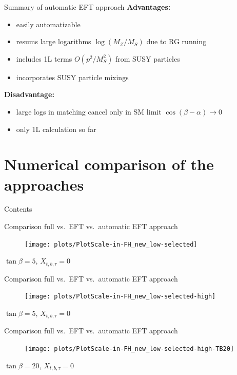 \documentclass[hyperref={pdfpagelabels=false},ngerman]{beamer}
\renewcommand{\emph}{\textbf}
\begin{document}
\begin{frame}{Summary of automatic EFT approach}
  \emph{Advantages:}
  \begin{itemize}
  \item easily automatizable
  \item resums large logarithms $\log(M_Z/M_S)$ due to RG running
  \item includes 1L terms $O(p^2/M_S^2)$ from SUSY particles
  \item incorporates SUSY particle mixings
  \end{itemize}
  \emph{Disadvantage:}
  \begin{itemize}
  \item large logs in matching cancel only in SM limit $\cos(\beta - \alpha) \rightarrow 0$
  \item only 1L calculation so far
  \end{itemize}
\end{frame}


\section{Numerical comparison of the approaches}

\begin{frame}{Contents}
  \tableofcontents[currentsection]  
\end{frame}

\begin{frame}{Comparison full vs.\ EFT vs.\ automatic EFT approach}
  \begin{figure}
    \centering
    \texttt{[image: plots/PlotScale-in-FH\_new\_low-selected]}
  \end{figure}
  $\tan\beta = 5$, $X_{t,b,\tau} = 0$
\end{frame}

\begin{frame}{Comparison full vs.\ EFT vs.\ automatic EFT approach}
  \begin{figure}
    \centering
    \texttt{[image: plots/PlotScale-in-FH\_new\_low-selected-high]}
  \end{figure}
  $\tan\beta = 5$, $X_{t,b,\tau} = 0$
\end{frame}

\begin{frame}[noframenumbering]{Comparison full vs.\ EFT vs.\ automatic EFT approach}
  \begin{figure}
    \centering
    \texttt{[image: plots/PlotScale-in-FH\_new\_low-selected-high-TB20]}
  \end{figure}
  $\tan\beta = 20$, $X_{t,b,\tau} = 0$
\end{frame}
\end{document}
